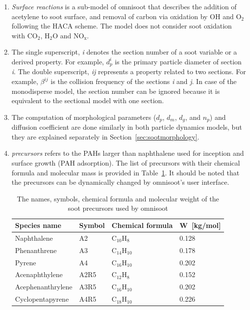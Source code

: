 \begin{enumerate}
\item \textit{Surface reactions} is a sub-model of omnisoot that describes the addition of acetylene to soot surface, and removal of carbon via oxidation by OH and $\mathrm{O_2}$ following the HACA scheme. The model does not consider soot oxidation with $\mathrm{CO_2}$, $\mathrm{H_2O}$ and $\mathrm{NO_x}$.

\item The single superscript, \textit{i} denotes the section number of a soot variable or a derived property. For example, $d^i_p$ is the primary particle diameter of section \textit{i}. The double superscript, \textit{ij} represents a property related to two sections. For example, $\beta^{ij}$ is the collision frequency of the sections \textit{i} and \textit{j}.  In case of the monodisperse model, the section number can be ignored because it is equivalent to the sectional model with one section.

\item The computation of morphological parameters ($d_p$, $d_m$, $d_g$, and $n_p$) and diffusion coefficient are done similarly in both particle dynamics models, but they are explained separately in Section~\ref{sec:sootmorphology}.

\item \textit{precursors} refers to the PAHs larger than naphthalene used for inception and surface growth (PAH adsorption). The list of precursors with their chemical formula and molecular mass is provided in Table~\ref{tab:precursors_list}. It should be noted that the precursors can be dynamically changed by omnisoot's user interface.

\begin{table}
	\caption{The names, symbols, chemical formula and molecular weight of the soot precursors used by omnisoot}
	\label{tab:precursors_list}
	\centering
	\begin{tabular}{l l l l}
		\hline
		Species name & Symbol & Chemical formula & W~[kg/mol] \\
		\hline
		Naphthalene       & A2   &  $\mathrm{C_{10}H_{8}}$   & 0.128 \\
		Phenanthrene      & A3   &  $\mathrm{C_{14}H_{10}}$  & 0.178 \\
		Pyrene            & A4   &  $\mathrm{C_{16}H_{10}}$  & 0.202 \\
		Acenaphthylene    & A2R5 &  $\mathrm{C_{12}H_{8}}$   & 0.152 \\
		Acephenanthrylene & A3R5 &  $\mathrm{C_{16}H_{10}}$  & 0.202 \\
		Cyclopentapyrene  & A4R5 &  $\mathrm{C_{18}H_{10}}$  & 0.226 \\
		\hline
	\end{tabular}
\end{table}

\end{enumerate}

